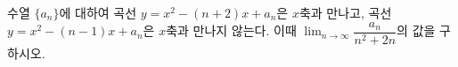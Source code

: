 수열 $\{a_n\}$에 대하여 곡선 $y=x^2-(n+2)x+a_n$은 $x$축과 만나고, 곡선 $y=x^2-(n-1)x+a_n$은 $x$축과 만나지 않는다. 이때 $\displaystyle\lim_{n\to\infty}\dfrac{a_n}{n^2+2n}$의 값을 구하시오.
